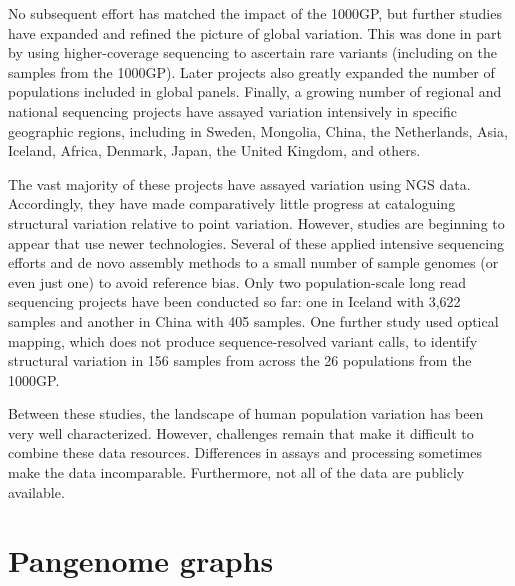 \documentclass[11pt]{ucthesis}
\begin{document}
No subsequent effort has matched the impact of the 1000GP, but further studies have expanded and refined the picture of global variation. This was done in part by using higher-coverage sequencing to ascertain rare variants\cite{telenti2016deep} (including on the samples from the 1000GP\cite{byrska2021high}). Later projects also greatly expanded the number of populations included in global panels\cite{mallick2016simons,pagani2016genomic,bergstrom2020insights}. Finally, a growing number of regional and national sequencing projects have assayed variation intensively in specific geographic regions, including in Sweden\cite{ameur2017swegen}, Mongolia\cite{bai2018whole}, China\cite{chiang2018comprehensive}, the Netherlands\cite{boomsma2014genome}, Asia\cite{genomeasia100k2019genomeasia}, Iceland\cite{gudbjartsson2015large}, Africa\cite{gurdasani2015african,sherman2019assembly}, Denmark\cite{maretty2017sequencing}, Japan\cite{nagasaki2015rare}, the United Kingdom\cite{uk10k2015uk10k}, and others.

The vast majority of these projects have assayed variation using NGS data. Accordingly, they have made comparatively little progress at cataloguing structural variation relative to point variation\cite{sudmant2015integrated}. However, studies are beginning to appear that use newer technologies. Several of these applied intensive sequencing efforts and de novo assembly methods to a small number of sample genomes\cite{ebert2021haplotype,audano2019characterizing,chaisson2019multi} (or even just one\cite{wu2021structural,seo2016novo}) to avoid reference bias. Only two population-scale long read sequencing projects have been conducted so far: one in Iceland with 3,622 samples\cite{beyter2021long} and another in China with 405 samples\cite{wu2021structural}. One further study used optical mapping, which does not produce sequence-resolved variant calls, to identify structural variation in 156 samples from across the 26 populations from the 1000GP\cite{levy2019genome}.

Between these studies, the landscape of human population variation has been very well characterized. However, challenges remain that make it difficult to combine these data resources. Differences in assays and processing sometimes make the data incomparable. Furthermore, not all of the data are publicly available.

\section{Pangenome graphs}
\end{document}

